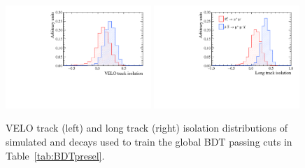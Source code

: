 
\begin{figure}[htbp]
    \centering
        \includegraphics[width=0.49\textwidth]{./Figs/Selection/iso_vel_Mar.pdf}
              \includegraphics[width=0.49\textwidth]{./Figs/Selection/long_track_Mar.pdf}
           \caption{VELO track (left) and long track (right) isolation distributions of simulated \bsmumu and \bbbarmumux decays used to train the global BDT passing cuts in Table~\ref{tab:BDTpresel}.}
    \label{fig:Isolations}
\end{figure}


